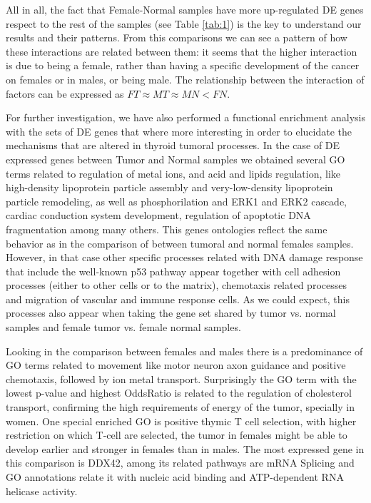 \documentclass[9pt,twocolumn,twoside]{gsajnl}
\begin{document}
                     
All in all, the fact that Female-Normal samples have more up-regulated DE genes respect to the rest of the samples (see Table \ref{tab:1}) 
is the key to understand our results and their patterns. From this comparisons we can see a pattern of how these interactions are related between them: it seems that the higher interaction is due to being a female, rather than having a specific development of the cancer on females or in males, or being male. The relationship between the interaction of factors can be expressed as $FT \approx MT \approx MN < FN$.

For further investigation, we have also performed a functional enrichment analysis with the sets of DE genes that where more interesting in order to elucidate the mechanisms that are altered in thyroid tumoral processes. In the case of DE expressed genes between Tumor and Normal samples we obtained several GO terms  %
related to regulation of metal ions, and acid and lipids regulation, like high-density lipoprotein particle assembly and very-low-density lipoprotein particle remodeling, as well as phosphorilation and ERK1 and ERK2 cascade, cardiac conduction system development, regulation of apoptotic DNA fragmentation among many others. This genes ontologies reflect the same behavior as in the comparison of between tumoral and normal females samples. %
However, in that case other specific processes related with DNA damage response that include the well-known p53 pathway appear together with cell adhesion processes (either to other cells or to the matrix), chemotaxis related processes and migration of vascular and immune response cells. 
As we could expect, this processes also appear when taking the gene set shared by tumor vs. normal samples and female tumor vs. female normal samples. 
	 	
Looking in the comparison between females and males there is a predominance of GO terms related to movement like motor neuron axon guidance and positive chemotaxis, followed by ion metal transport. Surprisingly the GO term with the lowest p-value and highest OddsRatio is related to the regulation of cholesterol transport, confirming the high requirements of energy of the tumor, specially in women. One special enriched GO is positive thymic T cell selection, with higher restriction on which T-cell are selected, the tumor in females might be able to develop earlier and stronger in females than in males. The most expressed gene in this comparison is DDX42, among its related pathways are mRNA Splicing and GO annotations relate it with nucleic acid binding and ATP-dependent RNA helicase activity.
\end{document}
